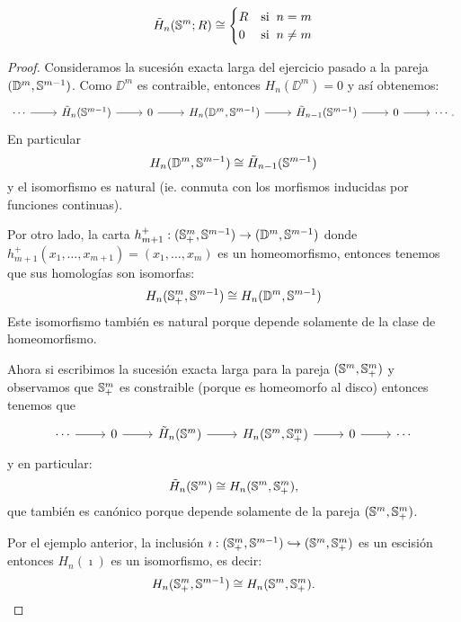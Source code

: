 \documentclass[../../topologia_algebraica]{subfiles}
\begin{document}
\begin{prop}
  \[
    \tilde{H}_n(\mathbb{S}^m;R)\cong
    \begin{cases}
      R &\text{si}\;\; n=m \\
      0 &\text{si}\;\; n\neq m
    \end{cases}
  \]
\end{prop}
\begin{proof}
  Consideramos la sucesi\'on exacta larga del ejercicio pasado a la pareja $(\mathbb{D}^m,\mathbb{S}^{m-1})$.
  Como $\DD^m$ es contraible, entonces $H_n(\DD^m)=0$ y as\'i obtenemos:
  \[
    \begin{tikzcd}
      \cdots \arrow[r] & \tilde{H}_n(\Sn^{m-1}) \arrow[r] & 0 \arrow[r] &
      H_n(\DD^m,\Sn^{m-1})\arrow[r] & \tilde{H}_{n-1}(\Sn^{m-1}) \arrow[r] & 0 \arrow[r] & \cdots.
    \end{tikzcd}
  \]
  En particular
  \begin{equation}
    \label{eq:iso_uno}
    H_n(\mathbb{D}^m,\mathbb{S}^{m-1})\cong \tilde{H}_{n-1}(\mathbb{S}^{m-1})
  \end{equation}
  y el isomorfismo es natural (ie. conmuta con los morfismos inducidas por funciones continuas).
  
  Por otro lado, la carta $h^+_{m+1}:(\mathbb{S}^m_+,\mathbb{S}^{m-1})\rightarrow (\mathbb{D}^m,\mathbb{S}^{m-1})$ donde
  $h^+_{m+1}(x_1,\ldots,x_{m+1})=(x_1,\ldots,x_m)$ es un homeomorfismo, entonces tenemos
  que sus homolog\'ias son isomorfas:
  \begin{equation}
    \label{eq:iso_dos}
    H_n(\mathbb{S}^m_+,\mathbb{S}^{m-1})\cong H_n(\mathbb{D}^m,\mathbb{S}^{m-1})
  \end{equation}
  Este isomorfismo tambi\'en es natural porque depende solamente de la clase de homeomorfismo.

  Ahora si escribimos la sucesi\'on exacta larga para la pareja $(\mathbb{S}^m,\mathbb{S}^m_+)$
  y observamos que $\mathbb{S}^m_+$ es constraible (porque es homeomorfo al disco) entonces
  tenemos que
  \[
    \begin{tikzcd}
      \cdots \arrow[r]& 0 \arrow[r] &  \tilde{H}_n(\Sn^m) \arrow[r] &
      H_n(\Sn^m,\Sn^m_+)\arrow[r] & 0 \arrow[r] & \cdots
    \end{tikzcd}
  \]
  y en particular:
  \begin{equation}
    \label{eq:iso_tres}
    \tilde{H}_n(\mathbb{S}^m)\cong H_n(\mathbb{S}^m,\mathbb{S}^m_+),
  \end{equation}
  que tambi\'en es can\'onico porque depende solamente de la pareja $(\mathbb{S}^m,\mathbb{S}^m_+)$.

  Por el ejemplo anterior, la inclusi\'on $\imath:(\mathbb{S}^m_+,\mathbb{S}^{m-1})\hookrightarrow (\mathbb{S}^m,\mathbb{S}^m_+)$
  es un escisi\'on entonces $H_n(\imath)$ es un isomorfismo, es decir:
  \begin{equation}
    \label{eq:iso_cuatro}
    H_n(\mathbb{S}^m_+,\mathbb{S}^{m-1})\cong H_n(\mathbb{S}^m,\mathbb{S}^m_+).
  \end{equation}


\end{proof}
\end{document}
